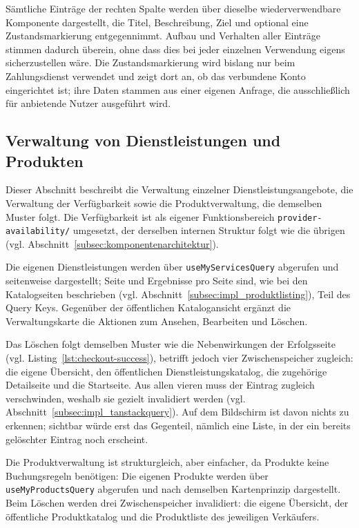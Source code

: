 Sämtliche Einträge der rechten Spalte werden über dieselbe
wiederverwendbare Komponente dargestellt, die Titel, Beschreibung,
Ziel und optional eine Zustandsmarkierung entgegennimmt. Aufbau und
Verhalten aller Einträge stimmen dadurch überein, ohne dass dies bei
jeder einzelnen Verwendung eigens sicherzustellen wäre. Die Zustandsmarkierung
wird bislang nur beim Zahlungsdienst verwendet und zeigt dort an, ob
das verbundene Konto eingerichtet ist; ihre Daten stammen aus einer
eigenen Anfrage, die ausschließlich für anbietende Nutzer ausgeführt
wird.

\subsection{Verwaltung von Dienstleistungen und Produkten}
\label{subsec:impl_dienstleistungsverwaltung}
\label{subsec:impl_produktverwaltung}

Dieser Abschnitt beschreibt die Verwaltung einzelner
Dienstleistungsangebote, die Verwaltung der Verfügbarkeit sowie die
Produktverwaltung, die demselben Muster folgt. Die Verfügbarkeit ist
als eigener Funktionsbereich \texttt{provider-availability/}
umgesetzt, der derselben internen Struktur folgt wie die übrigen
(vgl. Abschnitt~\ref{subsec:komponentenarchitektur}).

Die eigenen Dienstleistungen werden über \texttt{useMyServicesQuery}
abgerufen und seitenweise dargestellt; Seite und Ergebnisse pro Seite
sind, wie bei den Katalogseiten beschrieben (vgl.
Abschnitt~\ref{subsec:impl_produktlisting}), Teil des Query Keys.
Gegenüber der öffentlichen Katalogansicht ergänzt die
Verwaltungskarte die Aktionen zum Ansehen, Bearbeiten und Löschen.

Das Löschen folgt demselben Muster wie die Nebenwirkungen der
Erfolgsseite (vgl. Listing~\ref{lst:checkout-success}), betrifft
jedoch vier Zwischenspeicher zugleich: die eigene Übersicht, den
öffentlichen Dienstleistungskatalog, die zugehörige Detailseite und
die Startseite. Aus allen vieren muss der Eintrag zugleich
verschwinden, weshalb sie gezielt invalidiert werden (vgl.
Abschnitt~\ref{subsec:impl_tanstackquery}). Auf dem Bildschirm ist
davon nichts zu erkennen; sichtbar würde erst das Gegenteil, nämlich
eine Liste, in der ein bereits gelöschter Eintrag noch erscheint.

Die Produktverwaltung ist strukturgleich, aber einfacher, da Produkte
keine Buchungsregeln benötigen: Die eigenen Produkte werden über
\texttt{useMyProductsQuery} abgerufen und nach demselben
Kartenprinzip dargestellt. Beim Löschen werden drei Zwischenspeicher
invalidiert: die eigene Übersicht, der öffentliche Produktkatalog und
die Produktliste des jeweiligen Verkäufers.

